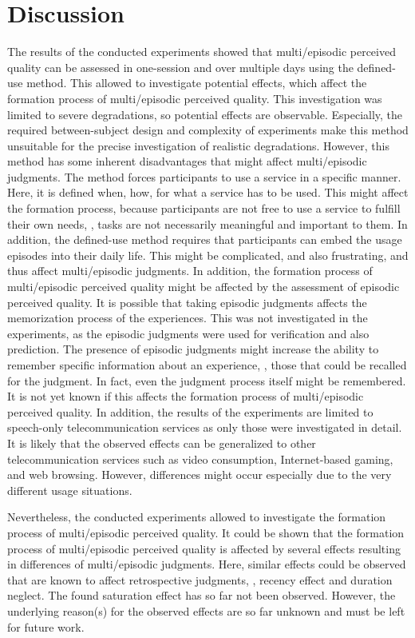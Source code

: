 \section{Discussion}
The results of the conducted experiments showed that multi\-/episodic perceived quality can be assessed in one-session and over multiple days using the defined-use method.
This allowed to investigate potential effects, which affect the formation process of multi\-/episodic perceived quality.
This investigation was limited to severe degradations, so potential effects are observable.
Especially, the required between-subject design and complexity of experiments make this method unsuitable for the precise investigation of realistic degradations.
However, this method has some inherent disadvantages that might affect multi\-/episodic judgments.
The method forces participants to use a service in a specific manner.
Here, it is defined when, how, for what a service has to be used.
This might affect the formation process, because participants are not free to use a service to fulfill their own needs, \ie, tasks are not necessarily meaningful and important to them.
In addition, the defined-use method requires that participants can embed the usage episodes into their daily life.
This might be complicated, and also frustrating, and thus affect multi\-/episodic judgments.
In addition, the formation process of multi\-/episodic perceived quality might be affected by the assessment of episodic perceived quality.
It is possible that taking episodic judgments affects the memorization process of the experiences.
This was not investigated in the experiments, as the episodic judgments were used for verification and also prediction.
The presence of episodic judgments might increase the ability to remember specific information about an experience, \ie, those that could be recalled for the judgment.
In fact, even the judgment process itself might be remembered.
It is not yet known if this affects the formation process of multi\-/episodic perceived quality.
In addition, the results of the experiments are limited to speech-only telecommunication services as only those were investigated in detail.
It is likely that the observed effects can be generalized to other telecommunication services such as video consumption, Internet-based gaming, and web browsing.
However, differences might occur especially due to the very different usage situations.

Nevertheless, the conducted experiments allowed to investigate the formation process of multi\-/episodic perceived quality.
It could be shown that the formation process of multi\-/episodic perceived quality is affected by several effects resulting in differences of multi\-/episodic judgments.
Here, similar effects could be observed that are known to affect retrospective judgments, \ie, recency effect and duration neglect.
The found saturation effect has so far not been observed.
However, the underlying reason(s) for the observed effects are so far unknown and must be left for future work.

